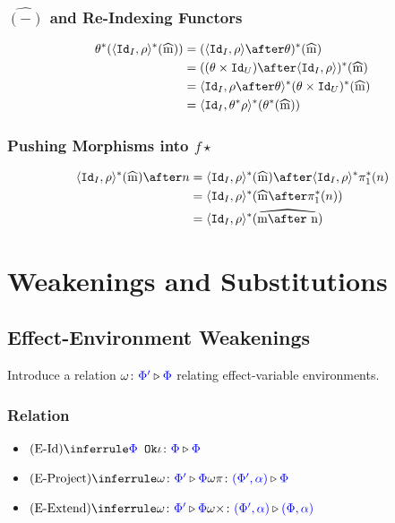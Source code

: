 \documentclass{report}
\begin{document}
    \subsection{$\hat{(-)}$ and Re-Indexing Functors}
    \begin{align*}
        \theta\star(\pr{\Id{I}}{\rho}\star(\widehat{m})) &= (\pr{\Id{I}}{\rho}\after\theta)\star(\widehat{m})\\
        & = ((\theta\times\Id{U})\after\pr{\Id{I}}{\rho})\star(\widehat{m})\\
        & = \pr{\Id{I}}{\rho\after\theta}\star(\theta\times\Id{U})\star(\widehat{m}) \\
        & = \pr{\Id{I}}{\theta\star\rho}\star(\theta\star(\widehat{m}))
    \end{align*}

\subsection{Pushing Morphisms into $f\star$}

\begin{align*}
    \pr{\Id{I}}{\rho}\star(\widehat{m})\after n &= \pr{\Id{I}}{\rho}\star(\widehat{m})\after\pr{\Id{I}}{\rho}\star\p\star(n)\\
    & = \pr{\Id{I}}{\rho}\star(\widehat{m}\after\pstar(n))\\
    &= \pr{\Id{I}}{\rho}\star(\widehat{m\after n})
\end{align*}


\chapter{Weakenings and Substitutions}
\section{Effect-Environment Weakenings}
        Introduce a relation $\omega \colon {\color{blue}\Phi'} \triangleright {\color {blue} \Phi}$ relating effect-variable environments.
        \subsection{Relation}

        \begin{itemize}
            \item $\ntreeruleI{\eid}{\ok{\P}}{\wrel{\i}{\P}{\P}}$
            \item $\ntreeruleI{\eproject}{\wrel{\w}{\P'}{\P}}{\wrel{\w\pi}{(\P', \a)}{\P}}$
            \item $\ntreeruleI{\eextend}{\wrel{\w}{\P'}{\P}}{\wrel{\w\x}{(\P', \a)}{(\P, \a)}}$
        \end{itemize}
\end{document}
